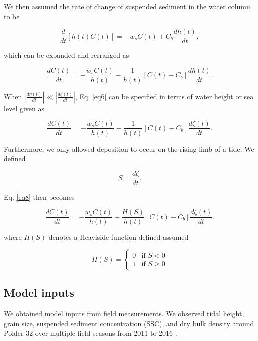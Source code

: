 We then assumed the rate of change of suspended sediment in the water column to be

\begin{equation}\label{eq5}
	\frac{d}{dt}[h(t)C(t)] = -w_s C(t) + C_b \frac{dh(t)}{dt},
\end{equation}

which can be expanded and rerranged as

\begin{equation}\label{eq6}
	\frac{dC(t)}{dt} = - \frac{w_s C(t)}{h(t)} - \frac{1}{h(t)} [C(t) - C_b] \frac{dh(t)}{dt}.
\end{equation}

When $\displaystyle\left\lvert \frac{d\eta(t)}{dt} \right\rvert \ll \displaystyle\left\lvert \frac{d\zeta(t)}{dt} \right\rvert$, Eq. \ref{eq6} can be specified in terms of water height or sea level given as

\begin{equation}\label{eq7}
	\frac{dC(t)}{dt} = - \frac{w_s C(t)}{h(t)} - \frac{1}{h(t)} [C(t) - C_b] \frac{d\zeta(t)}{dt}.
\end{equation}

Furthermore, we only allowed deposition to occur on the rising limb of a tide. We defined 

\begin{equation}\label{eq8}
  S = \frac{d\zeta}{dt}.
\end{equation}

Eq. \ref{eq8} then becomes

\begin{equation}\label{eq9}
	\frac{dC(t)}{dt} = - \frac{w_s C(t)}{h(t)} - \frac{H(S)}{h(t)} [C(t) - C_b] \frac{d\zeta(t)}{dt}.
\end{equation}

where $H(S)$ denotes a Heaviside function defined assumed

\begin{equation}\label{eq8}
	H(S) = 
  \begin{cases}
    0 & \text{if $S < 0$}\\
    1 & \text{if $S \geq 0$}
  \end{cases}
\end{equation}

\subsection{Model inputs}

We obtained model inputs from field measurements. We observed tidal height, grain size, suspended sediment concentration (SSC), and dry bulk density around Polder 32 over multiple field seasons from 2011 to 2016 \citet{auerbachFloodRiskNatural2015,haleObservationsScalingTidal2019,haleSeasonalVariabilityForces2019}.

